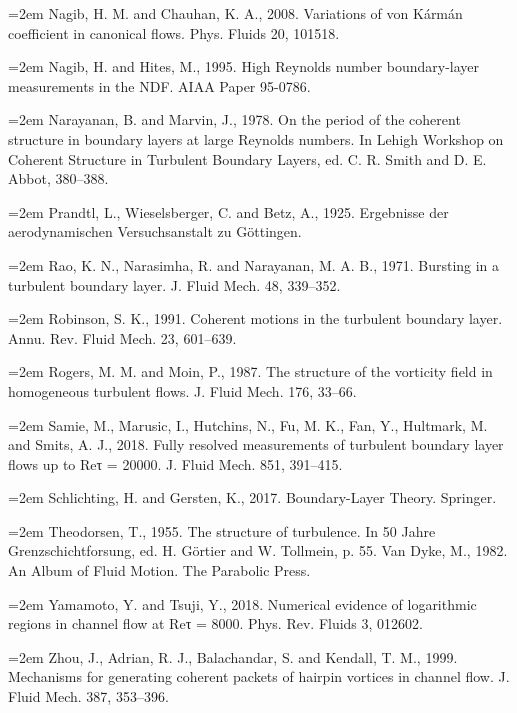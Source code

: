\documentclass[12pt,a4paper,openany,fontset=none]{ctexbook}
\begin{document}
\par\hangindent=2em Nagib, H. M. and Chauhan, K. A., 2008. Variations of von Kármán coefficient in canonical flows. Phys. Fluids 20, 101518.
\par\hangindent=2em Nagib, H. and Hites, M., 1995. High Reynolds number boundary-layer measurements in the NDF. AIAA Paper 95-0786.
\par\hangindent=2em Narayanan, B. and Marvin, J., 1978. On the period of the coherent structure in boundary layers at large Reynolds numbers. In Lehigh Workshop on Coherent Structure in Turbulent Boundary Layers, ed. C. R. Smith and D. E. Abbot, 380–388.
\par\hangindent=2em Prandtl, L., Wieselsberger, C. and Betz, A., 1925. Ergebnisse der aerodynamischen Versuchsanstalt zu Göttingen.
\par\hangindent=2em Rao, K. N., Narasimha, R. and Narayanan, M. A. B., 1971. Bursting in a turbulent boundary layer. J. Fluid Mech. 48, 339–352.
\par\hangindent=2em Robinson, S. K., 1991. Coherent motions in the turbulent boundary layer. Annu. Rev. Fluid Mech. 23, 601–639.
\par\hangindent=2em Rogers, M. M. and Moin, P., 1987. The structure of the vorticity field in homogeneous turbulent flows. J. Fluid Mech. 176, 33–66.
\par\hangindent=2em Samie, M., Marusic, I., Hutchins, N., Fu, M. K., Fan, Y., Hultmark, M. and Smits, A. J., 2018. Fully resolved measurements of turbulent boundary layer flows up to Reτ = 20000. J. Fluid Mech. 851, 391–415.
\par\hangindent=2em Schlichting, H. and Gersten, K., 2017. Boundary-Layer Theory. Springer.
\par\hangindent=2em Theodorsen, T., 1955. The structure of turbulence. In 50 Jahre Grenzschichtforsung, ed. H. Görtier and W. Tollmein, p. 55. Van Dyke, M., 1982. An Album of Fluid Motion. The Parabolic Press.
\par\hangindent=2em Yamamoto, Y. and Tsuji, Y., 2018. Numerical evidence of logarithmic regions in channel flow at Reτ = 8000. Phys. Rev. Fluids 3, 012602.
\par\hangindent=2em Zhou, J., Adrian, R. J., Balachandar, S. and Kendall, T. M., 1999. Mechanisms for generating coherent packets of hairpin vortices in channel flow. J. Fluid Mech. 387, 353–396.
\end{document}
